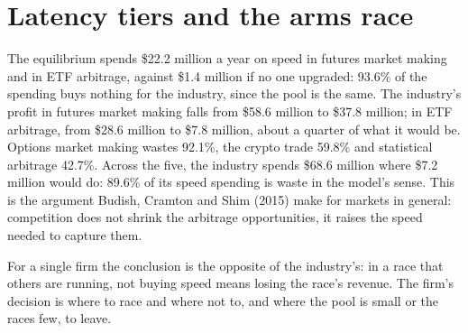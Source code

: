 \begin{omfigure}

\label{fig:fm:technology-strategy:race}
\end{omfigure}

\section{Latency tiers and the arms race}

The equilibrium spends \$22.2 million a year on speed in futures market making and in ETF arbitrage, against \$1.4 million if no one upgraded: 93.6\%
of the spending buys nothing for the industry, since the pool is the same. The industry's profit in futures market making falls from \$58.6 million
to \$37.8 million; in ETF arbitrage, from \$28.6 million to \$7.8 million, about a quarter of what it would be. Options market making wastes 92.1\%, the
crypto trade 59.8\% and statistical arbitrage 42.7\%. Across the five, the industry spends \$68.6 million where \$7.2 million would do: 89.6\% of
its speed spending is waste in the model's sense. This is the argument Budish, Cramton and Shim (2015) make for markets in general: competition does
not shrink the arbitrage opportunities, it raises the speed needed to capture them.

For a single firm the conclusion is the opposite of the industry's: in a race that others are running, not buying speed means losing the race's
revenue. The firm's decision is where to race and where not to, and where the pool is small or the races few, to leave.

